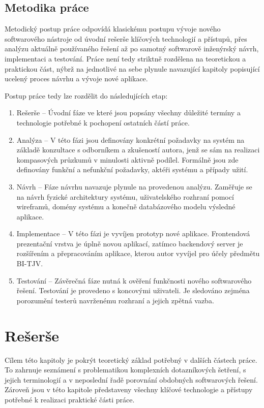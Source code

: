 \section*{Metodika práce}
Metodický postup práce odpovídá klasickému postupu vývoje nového softwarového nástroje od úvodní rešerše 
klíčových technologií a přístupů, přes analýzu aktuálně používaného řešení až po samotný softwarově 
inženýrský návrh, implementaci a testování. Práce není tedy striktně rozdělena na teoretickou a praktickou část, 
nýbrž na jednotlivé na sebe plynule navazující kapitoly popisující ucelený proces návrhu a vývoje nové aplikace. 

Postup práce tedy lze rozdělit do následujících etap:
\begin{enumerate}
    \item Rešerše – Úvodní fáze ve které jsou popsány všechny důležité termíny a technologie 
    potřebné k pochopení ostatních částí práce.
    \item Analýza –  V této fázi jsou definovány konkrétní požadavky na systém na základě konzultace s 
    odborníkem a zkušeností autora, jenž se sám na realizaci kompasových průzkumů v minulosti aktivně podílel. 
    Formálně jsou zde definovány funkční a nefunkční požadavky, aktéři systému a případy užití.
    \item Návrh – Fáze návrhu navazuje plynule na provedenou analýzu. Zaměřuje se na návrh fyzické architektury systému, uživatelského rozhraní pomocí wireframů, 
    domény systému a konečně databázového modelu výsledné aplikace.
    \item Implementace – V této fázi je vyvíjen prototyp nové aplikace. Frontendová prezentační vrstva je úplně novou aplikací, zatímco backendový server je rozšířením a přepracováním aplikace, 
    kterou autor vyvíjel pro účely předmětu BI-TJV.
    \item Testování – Závěrečná fáze nutná k ověření funkčnosti nového softwarového řešení. Testování je provedeno s koncovými uživateli. Je sledováno zejména porozumění 
    testerů navrženému rozhraní a jejich zpětná vazba.
\end{enumerate}


\chapter{Rešerše}
Cílem této kapitoly je pokrýt teoretický základ potřebný v dalších 
částech práce. To zahrnuje seznámení s problematikou komplexních 
dotazníkových šetření, s jejich terminologií a v neposlední řadě 
porovnání obdobných softwarových řešení. Zároveň jsou v této kapitole
představeny všechny klíčové technologie a přístupy potřebné k realizaci praktické
části práce.  

